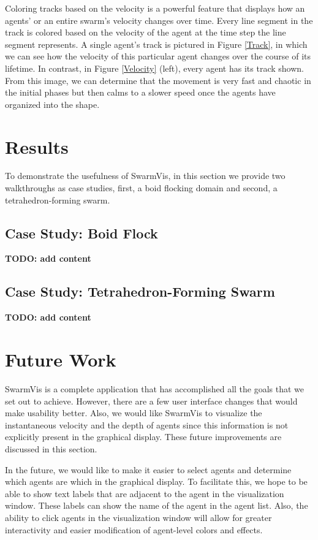 \documentclass[conference]{IEEEtran}
\begin{document}
Coloring tracks based on the velocity is a powerful feature that displays how an agents' or an entire swarm's
velocity changes over time.
Every line segment in the track is colored based on the velocity of the agent at the time step the line segment represents.
A single agent's track is pictured in Figure \ref{Track}, in which we can see how the velocity of this particular agent changes
over the course of its lifetime.
In contrast, in Figure \ref{Velocity} (left), every agent has its track shown.
From this image, we can determine that the movement is very fast and chaotic in the initial phases but then calms to a slower
speed once the agents have organized into the shape.

\section{Results}

To demonstrate the usefulness of SwarmVis, in this section we provide two walkthroughs as case studies, first,
a boid flocking domain and second, a tetrahedron-forming swarm.

\subsection{Case Study: Boid Flock}

\textbf{TODO: add content}

\subsection{Case Study: Tetrahedron-Forming Swarm}

\textbf{TODO: add content}

\section{Future Work}
SwarmVis is a complete application that has accomplished all the goals that we set out to achieve. 
However, there are a few user interface changes that would make usability better.
Also, we would like SwarmVis to visualize the instantaneous velocity and the depth of
agents since this information is not explicitly present in the
graphical display. These future improvements are discussed in this section.

In the future, we would like to make it easier to select agents and determine which agents are which in the graphical display.
To facilitate this, we hope to be able to show text labels that are adjacent to the agent in the visualization window.
These labels can show the name of the agent in the agent list.
Also, the ability to click agents in the visualization window will allow for greater interactivity and easier modification of agent-level colors and effects.
\end{document}
